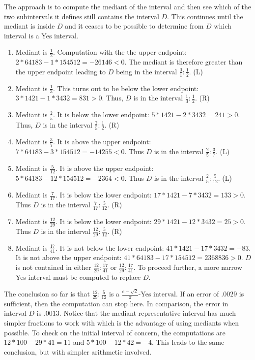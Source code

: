 \documentclass[12pt]{article}
\theoremstyle{remark}
\begin{document}
The approach is to compute the mediant of the interval and then see which of the two subintervals it defines still contains the interval $D$. This continues until the mediant is inside $D$ and it ceases to be possible to determine from $D$ which interval is a Yes interval. 
\begin{enumerate}
\item Mediant is $\frac{1}{2}$. Computation with the the upper endpoint:  $2*64183 - 1*154512 = -26146 < 0$. The mediant is therefore greater than the upper endpoint leading to $D$ being in the interval $\frac{0}{1}: \frac{1}{2}$. (L)
\item Mediant is $\frac{1}{3}$. This turns out to be below the lower endpoint:  $3*1421 - 1*3432 = 831>0$. Thus, $D$ is in the interval $\frac{1}{3}: \frac{1}{2}$. (R)
\item Mediant is $\frac{2}{5}$. It is below the lower endpoint: $5*1421 - 2*3432 = 241 > 0$. Thus, $D$ is in the interval $\frac{2}{5}: \frac{1}{2}$. (R)
\item Mediant is $\frac{3}{7}$. It is above the upper endpoint: $7*64183- 3*154512 = -14255 < 0$. Thus $D$ is in the interval $\frac{2}{5}: \frac{3}{7}$. (L)
\item Mediant is $\frac{5}{12}$. It is above the upper endpoint: $5*64183 - 12*154512 = -2364 < 0$. Thus $D$ is in the interval $\frac{2}{5}: \frac{5}{12}$. (L)
\item Mediant is $\frac{7}{17}$. It is below the lower endpoint: $17*1421 - 7*3432 = 133 > 0$. Thus $D$ is in the interval $\frac{7}{17}: \frac{5}{12}$. (R)
\item Mediant is $\frac{12}{29}$. It is below the lower endpoint: $29*1421 - 12*3432 = 25 > 0$. Thus $D$ is in the interval $\frac{12}{29}: \frac{5}{12}$. (R)
\item Mediant is $\frac{17}{41}$. It is not below the lower endpoint: $41*1421-17*3432 = -83$. It is not above the upper endpoint: $41*64183-17*154512 = 2368836 >0$. $D$ is not contained in either $\frac{12}{29}: \frac{17}{41}$ or $\frac{12}{29}:\frac{17}{41}$. To proceed further, a more narrow Yes interval must be computed to replace $D$. 
\end{enumerate}
The conclusion so far is that $\frac{12}{29}: \frac{5}{12}$ is a $\frac{e-\sqrt{2}}{\pi}$-Yes interval. If an error of $.0029$ is sufficient, then the computation can stop here. In comparison, the error in interval $D$ is $.0013$. Notice that the mediant representative interval has much simpler fractions to work with which is the advantage of using mediants when possible. To check on the initial interval of concern, the computations are $12*100 - 29*41 = 11$ and $5*100-12*42 = -4$. This leads to the same conclusion, but with simpler arithmetic involved. 
\end{document}
